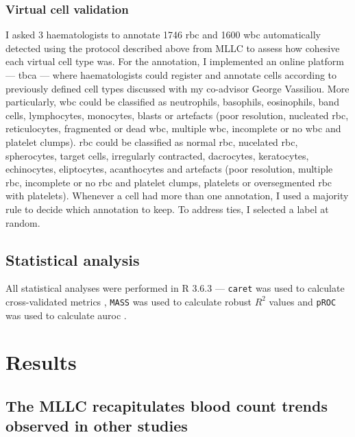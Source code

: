\subsubsection{Virtual cell validation}

I asked 3 haematologists to annotate 1746 \ac{rbc} and 1600 \ac{wbc} automatically detected using the protocol described above from MLLC to assess how cohesive each virtual cell type was. For the annotation, I implemented an online platform --- \ac{tbca} --- where haematologists could register and annotate cells according to previously defined cell types discussed with my co-advisor George Vassiliou. More particularly, \ac{wbc} could be classified as neutrophils, basophils, eosinophils, band cells, lymphocytes, monocytes, blasts or artefacts (poor resolution, nucleated \ac{rbc}, reticulocytes, fragmented or dead \ac{wbc}, multiple \ac{wbc}, incomplete or no \ac{wbc} and platelet clumps). \Ac{rbc} could be classified as normal \ac{rbc}, nucelated \ac{rbc}, spherocytes, target cells, irregularly contracted, dacrocytes, keratocytes, echinocytes, eliptocytes, acanthocytes and artefacts (poor resolution, multiple \ac{rbc}, incomplete or no \ac{rbc} and platelet clumps, platelets or oversegmented \ac{rbc} with platelets). Whenever a cell had more than one annotation, I used a majority rule to decide which annotation to keep. To address ties, I selected a label at random.

\subsection{Statistical analysis}

All statistical analyses were performed in R 3.6.3 \cite{R-core-team} --- \texttt{caret} was used to calculate cross-validated metrics \cite{Kuhn-2021-caret}, \texttt{MASS} was used to calculate robust $R^2$ values \cite{Venables-2002-mass} and \texttt{pROC} was used to calculate \ac{auroc} \cite{Robin-2011-proc}. 

\section{Results}

\subsection{The MLLC recapitulates blood count trends observed in other studies}

